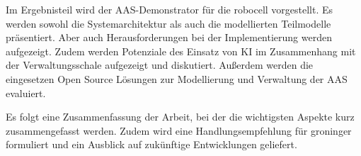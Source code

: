 Im Ergebnisteil wird der AAS-Demonstrator für die robocell vorgestellt. Es werden sowohl die Systemarchitektur als auch die modellierten Teilmodelle präsentiert.
Aber auch Herausforderungen bei der Implementierung werden aufgezeigt.
Zudem werden Potenziale des Einsatz von KI im Zusammenhang mit der Verwaltungsschale aufgezeigt und diskutiert.
Außerdem werden die eingesetzen Open Source Lösungen zur Modellierung und Verwaltung der AAS evaluiert.


Es folgt eine Zusammenfassung der Arbeit, bei der die wichtigsten Aspekte kurz zusammengefasst werden.
Zudem wird eine Handlungsempfehlung für groninger formuliert und ein Ausblick auf zukünftige Entwicklungen geliefert.